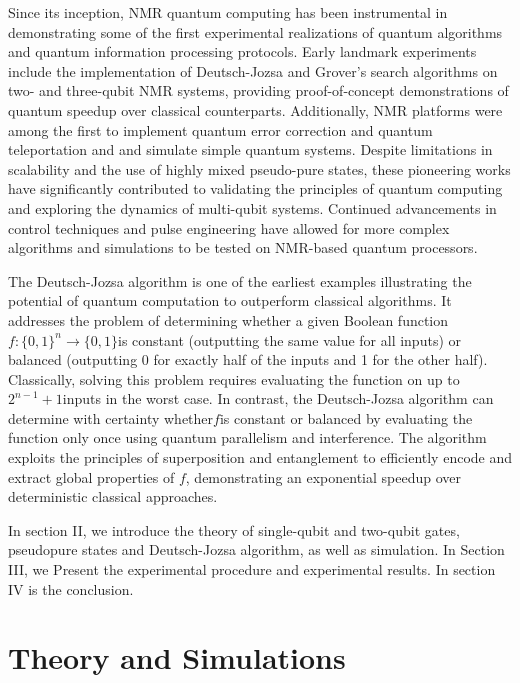 \documentclass[%
 reprint,
 amsmath,amssymb,
 aps,
]{revtex4-2}
\begin{document}
Since its inception, NMR quantum computing has been instrumental in demonstrating some of the first experimental realizations of quantum algorithms and quantum information processing protocols. Early landmark experiments include the implementation of Deutsch-Jozsa and Grover's search algorithms on two- and three-qubit NMR systems, providing proof-of-concept demonstrations of quantum speedup over classical counterparts\cite{Chuang1998}\cite{Jones1998}. Additionally, NMR platforms were among the first to implement quantum error correction\cite{Cory1998} and quantum teleportation\cite{Nielsen1998} and and simulate simple quantum systems\cite{Vandersypen2001}. Despite limitations in scalability and the use of highly mixed pseudo-pure states, these pioneering works have significantly contributed to validating the principles of quantum computing and exploring the dynamics of multi-qubit systems. Continued advancements in control techniques and pulse engineering have allowed for more complex algorithms and simulations to be tested on NMR-based quantum processors.

The Deutsch-Jozsa algorithm is one of the earliest examples illustrating the potential of quantum computation to outperform classical algorithms. It addresses the problem of determining whether a given Boolean function$f:\{0, 1\}^n\rightarrow\{0, 1\}$is constant (outputting the same value for all inputs) or balanced (outputting 0 for exactly half of the inputs and 1 for the other half). Classically, solving this problem requires evaluating the function on up to$2^{n-1}+1$inputs in the worst case. In contrast, the Deutsch-Jozsa algorithm can determine with certainty whether$f$is constant or balanced by evaluating the function only once using quantum parallelism and interference. The algorithm exploits the principles of superposition and entanglement to efficiently encode and extract global properties of $f$, demonstrating an exponential speedup over deterministic classical approaches.\cite{Deutsch1992}

In section II, we introduce the theory of single-qubit and two-qubit gates, pseudopure states and Deutsch-Jozsa algorithm, as well as simulation. In Section III, we Present the experimental procedure and experimental results. In section IV is the conclusion.

\section{Theory and Simulations}
\end{document}
